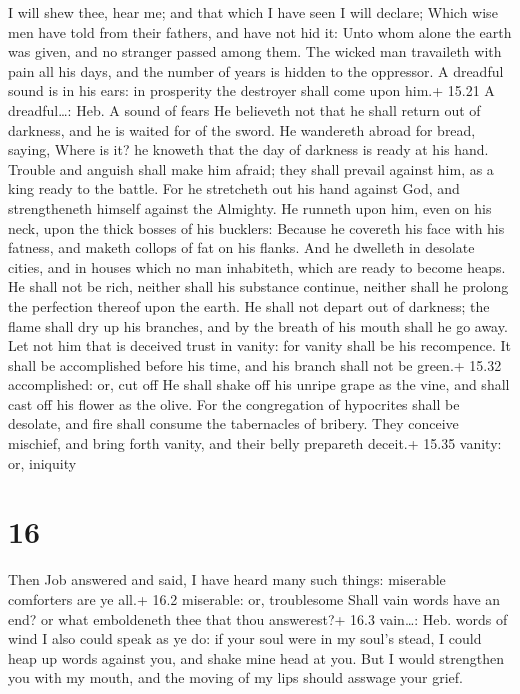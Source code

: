  I will shew thee, hear me; and that which I have seen I
will declare;  Which wise men have told from their fathers,
and have not hid it:  Unto whom alone the earth was given,
and no stranger passed among them.  The wicked man
travaileth with pain all his days, and the number of years is hidden to
the oppressor.  A dreadful sound is in his ears: in
prosperity the destroyer shall come upon him.+ 15.21 A dreadful\ldots:
Heb. A sound of fears  He believeth not that he shall
return out of darkness, and he is waited for of the sword. 
He wandereth abroad for bread, saying, Where is it? he knoweth that the
day of darkness is ready at his hand.  Trouble and anguish
shall make him afraid; they shall prevail against him, as a king ready
to the battle.  For he stretcheth out his hand against God,
and strengtheneth himself against the Almighty.  He runneth
upon him, even on his neck, upon the thick bosses of his bucklers:
 Because he covereth his face with his fatness, and maketh
collops of fat on his flanks.  And he dwelleth in desolate
cities, and in houses which no man inhabiteth, which are ready to become
heaps.  He shall not be rich, neither shall his substance
continue, neither shall he prolong the perfection thereof upon the
earth.  He shall not depart out of darkness; the flame
shall dry up his branches, and by the breath of his mouth shall he go
away.  Let not him that is deceived trust in vanity: for
vanity shall be his recompence.  It shall be accomplished
before his time, and his branch shall not be green.+ 15.32 accomplished:
or, cut off  He shall shake off his unripe grape as the
vine, and shall cast off his flower as the olive.  For the
congregation of hypocrites shall be desolate, and fire shall consume the
tabernacles of bribery.  They conceive mischief, and bring
forth vanity, and their belly prepareth deceit.+ 15.35 vanity: or,
iniquity

\hypertarget{section-15}{%
\section{16}\label{section-15}}

 Then Job answered and said,  I have heard many
such things: miserable comforters are ye all.+ 16.2 miserable: or,
troublesome  Shall vain words have an end? or what
emboldeneth thee that thou answerest?+ 16.3 vain\ldots: Heb. words of
wind  I also could speak as ye do: if your soul were in my
soul's stead, I could heap up words against you, and shake mine head at
you.  But I would strengthen you with my mouth, and the
moving of my lips should asswage your grief.

